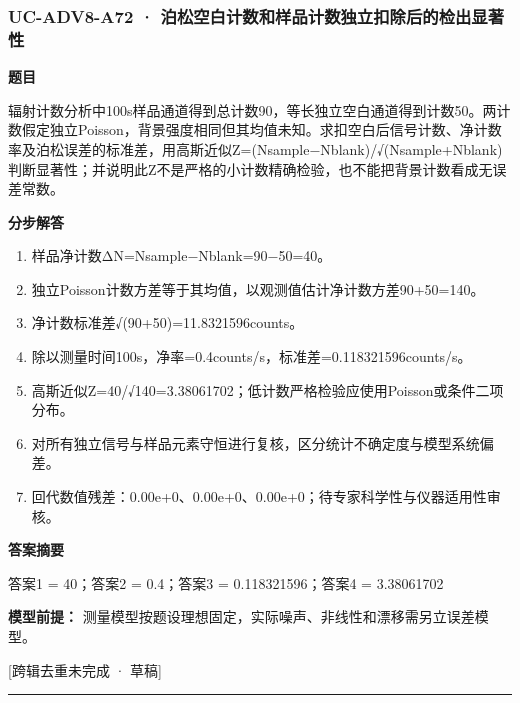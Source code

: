 \documentclass[UTF8,11pt,a4paper]{ctexart}
\begin{document}
\subsubsection*{UC-ADV8-A72 · 泊松空白计数和样品计数独立扣除后的检出显著性}
\noindent\textbf{题目}\par
辐射计数分析中100s样品通道得到总计数90，等长独立空白通道得到计数50。两计数假定独立Poisson，背景强度相同但其均值未知。求扣空白后信号计数、净计数率及泊松误差的标准差，用高斯近似Z=(Nsample−Nblank)/√(Nsample+Nblank)判断显著性；并说明此Z不是严格的小计数精确检验，也不能把背景计数看成无误差常数。\par
\medskip\noindent\textbf{分步解答}
\begin{enumerate}
\item 样品净计数ΔN=Nsample−Nblank=90−50=40。
\item 独立Poisson计数方差等于其均值，以观测值估计净计数方差90+50=140。
\item 净计数标准差√(90+50)=11.8321596counts。
\item 除以测量时间100s，净率=0.4counts/s，标准差=0.118321596counts/s。
\item 高斯近似Z=40/√140=3.38061702；低计数严格检验应使用Poisson或条件二项分布。
\item 对所有独立信号与样品元素守恒进行复核，区分统计不确定度与模型系统偏差。
\item 回代数值残差：0.00e+0、0.00e+0、0.00e+0；待专家科学性与仪器适用性审核。
\end{enumerate}
\noindent\textbf{答案摘要}\par
答案1 = 40；答案2 = 0.4；答案3 = 0.118321596；答案4 = 3.38061702\par
\noindent\textbf{模型前提：}
测量模型按题设理想固定，实际噪声、非线性和漂移需另立误差模型。\par
\noindent\textcolor{red!65!black}{[跨辑去重未完成 · 草稿]} \par
\medskip\hrule\medskip
{}
\end{document}
